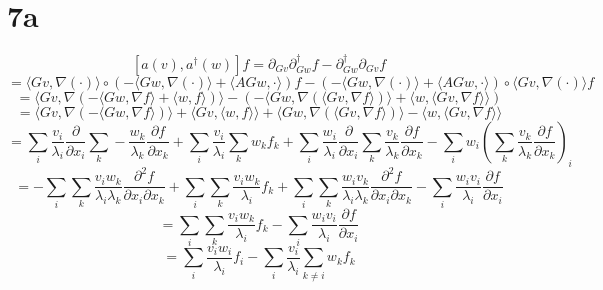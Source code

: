 \documentclass{article}
\begin{document}
\section*{7a}
\[
  [a(v), a^{\dagger}(w)]f=\partial_{Gv}\partial_{Gw}^{\dagger}f-\partial^{\dagger}_{Gw}\partial_{Gv}f
\]
\[
  =\langle Gv, \nabla(\cdot) \rangle\circ\left( -\langle Gw,\nabla(\cdot) \rangle+\langle AGw,\cdot \rangle \right)f
  -\left( -\langle Gw,\nabla(\cdot) \rangle+\langle AGw,\cdot \rangle \right)\circ\langle Gv,\nabla(\cdot) \rangle f
\]
\[
  =\langle Gv,\nabla\left( -\langle Gw,\nabla f \rangle+\langle w,f \rangle \right) \rangle
  -(-\langle Gw,\nabla\left( \langle Gv,\nabla f \rangle \right) \rangle+\langle w,\langle Gv,\nabla f \rangle \rangle)
\]
\[
  =\langle Gv,\nabla(-\langle Gw,\nabla f \rangle) \rangle+\langle Gv,\langle w,f \rangle \rangle
  +\langle Gw,\nabla(\langle Gv,\nabla f \rangle) \rangle
  -\langle w,\langle Gv,\nabla f \rangle \rangle
\]
\[
  =\sum_{i}\frac{v_{i}}{\lambda_{i}}\frac{\partial}{\partial x_{i}}\sum_{k}-\frac{w_{k}}{\lambda_{k}}\frac{\partial f}{\partial x_{k}}
  +\sum_{i}\frac{v_{i}}{\lambda_{i}}\sum_{k}w_{k}f_{k}
  +\sum_{i}\frac{w_{i}}{\lambda_{i}}\frac{\partial}{\partial x_{i}}\sum_{k}\frac{v_{k}}{\lambda_{k}}\frac{\partial f}{\partial x_{k}}
  -\sum_{i}w_{i}\left( \sum_{k}\frac{v_{k}}{\lambda_{k}}\frac{\partial f}{\partial x_{k}}\right)_{i}
\]
\[
  =-\sum_{i}\sum_{k}\frac{v_{i}w_{k}}{\lambda_{i}\lambda_{k}}\frac{\partial^{2} f}{\partial x_{i}\partial x_{k}}
  +\sum_{i}\sum_{k}\frac{v_{i}w_{k}}{\lambda_{i}}f_{k}
  +{\sum_{i}}\sum_{k}\frac{w_{i}v_{k}}{\lambda_{i}\lambda_{k}}\frac{\partial^{2}f}{\partial x_{i}\partial x_{k}}
  -\sum_{i}\frac{w_{i}v_{i}}{\lambda_{i}}\frac{\partial f}{\partial x_{i}}
\]
\[
  =\sum_{i}\sum_{k}\frac{v_{i}w_{k}}{\lambda_{i}}f_{k}-\sum_{i}\frac{w_{i}v_{i}}{\lambda_{i}}\frac{\partial f}{\partial x_{i}}
\]
\[
  =\sum_{i}\frac{v_{i}w_{i}}{\lambda_{i}}f_{i}-\sum_{i}\frac{v_{i}}{\lambda_{i}}\sum_{k\neq i}{w_{k}}f_{k}
\]
\end{document}
